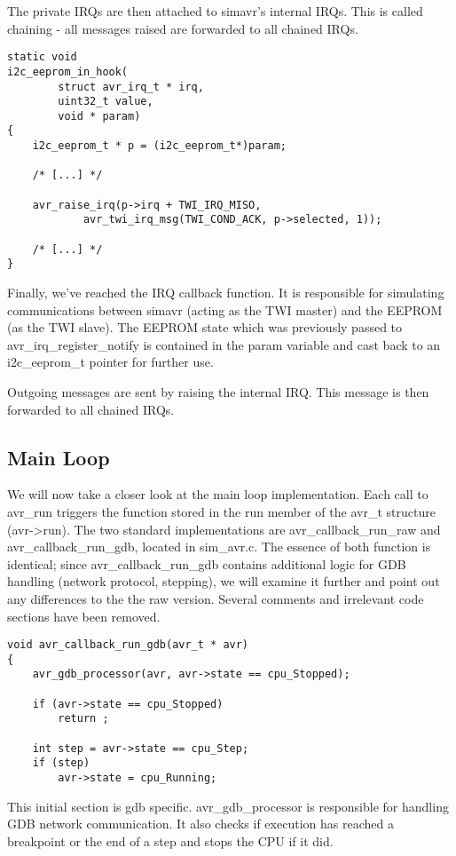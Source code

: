 The private IRQs are then attached to simavr's internal IRQs. This is called
chaining - all messages raised are forwarded to all chained IRQs.

\begin{lstlisting}
static void
i2c_eeprom_in_hook(
		struct avr_irq_t * irq,
		uint32_t value,
		void * param)
{
	i2c_eeprom_t * p = (i2c_eeprom_t*)param;

    /* [...] */

    avr_raise_irq(p->irq + TWI_IRQ_MISO,
            avr_twi_irq_msg(TWI_COND_ACK, p->selected, 1));

    /* [...] */
}
\end{lstlisting}

Finally, we've reached the IRQ callback function. It is responsible for
simulating communications between simavr (acting as the TWI master) and the
EEPROM (as the TWI slave). The EEPROM state which was previously passed to
avr\_irq\_register\_notify is contained in the param variable and cast back to
an i2c\_eeprom\_t pointer for further use.

Outgoing messages are sent by raising the internal IRQ. This message is then
forwarded to all chained IRQs.

\subsection{Main Loop}

We will now take a closer look at the main loop implementation. Each call to
avr\_run triggers the function stored in the run member of the avr\_t structure
(avr-\textgreater run). The two standard implementations are avr\_callback\_run\_raw and
avr\_callback\_run\_gdb, located in sim\_avr.c. The essence of both function is
identical; since avr\_callback\_run\_gdb contains additional logic for GDB
handling (network protocol, stepping), we will examine it further and point out
any differences to the the raw version. Several comments and irrelevant code
sections have been removed.

\begin{lstlisting}
void avr_callback_run_gdb(avr_t * avr)
{
    avr_gdb_processor(avr, avr->state == cpu_Stopped);

    if (avr->state == cpu_Stopped)
        return ;

    int step = avr->state == cpu_Step;
    if (step)
        avr->state = cpu_Running;
\end{lstlisting}

This initial section is gdb specific. avr\_gdb\_processor is responsible for
handling GDB network communication. It also checks if execution has reached a
breakpoint or the end of a step and stops the CPU if it did.

